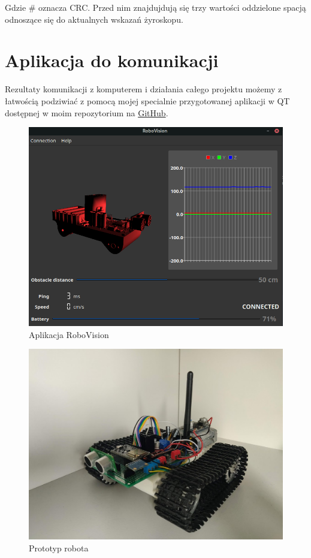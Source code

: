 \documentclass[10pt, a4paper]{article}
\begin{document}
Gdzie \# oznacza CRC. Przed nim znajdujdują się trzy wartości oddzielone spacją
odnoszące się do aktualnych wskazań żyroskopu.


\section{Aplikacja do komunikacji}
Rezultaty komunikacji z komputerem i działania całego projektu możemy z
łatwością podziwiać z pomocą mojej specialnie przygotowanej aplikacji w QT
dostępnej w moim repozytorium na
\href{https://github.com/mbober1/RoboVision}{GitHub}.

\begin{figure}[H]
	\centering
	\includegraphics[width=1\textwidth]{figures/app.png}
	\caption{Aplikacja RoboVision}
	\label{fig:app}
\end{figure}


\begin{figure}[H]
	\centering
	\includegraphics[width=1\textwidth]{figures/robotv1.jpg}
	\caption{Prototyp robota}
	\label{fig:robot}
\end{figure}
\end{document}
